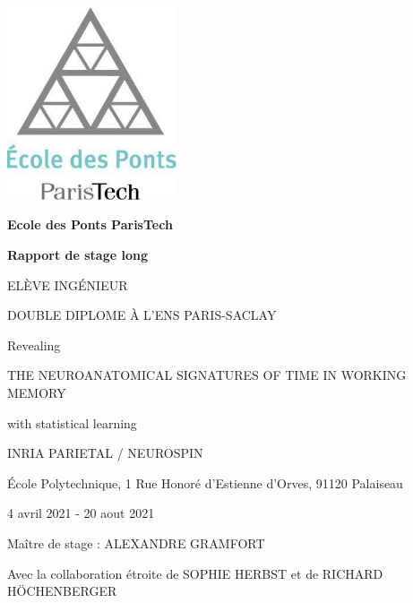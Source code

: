 \begin{titlepage}
    \begin{center}
        
        
        \includegraphics[width=5cm]{preliminaries/images/logo_ponts.jpg}
        
        \vspace{0.5cm}
        
        \textbf{Ecole des Ponts ParisTech}

        \vspace{1.5cm}
        
        \textbf{\Large Rapport de stage long}
        
        \vspace{0.5cm}
        
        \MakeUppercase{\theauthor{}}
        
        \MakeUppercase{Elève ingénieur}
        
        \MakeUppercase{Double diplome à l'ENS Paris-Saclay}
        
        \vspace{1.5cm}
        
        Revealing
        
        \MakeUppercase{\Large the neuroanatomical signatures of time in working memory}
        
        with statistical learning
        
        
    
        
        
        
        \vfill
        
        \MakeUppercase{INRIA Parietal / Neurospin}
        
        École Polytechnique, 1 Rue Honoré d'Estienne d'Orves, 91120 Palaiseau
        
        4 avril 2021 - 20 aout 2021
        
        Maître de stage : \MakeUppercase{Alexandre Gramfort}
        
        Avec la collaboration étroite de \MakeUppercase{Sophie Herbst} et de \MakeUppercase{Richard Höchenberger}


        


        
    
        
    \end{center}
\end{titlepage}
